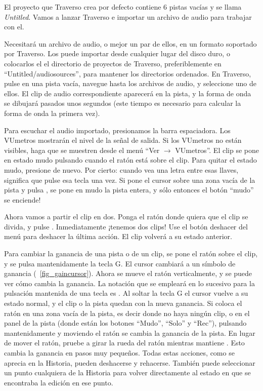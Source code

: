 ﻿El proyecto que Traverso crea por defecto contiene 6 pistas vacías y se llama \emph{Untitled}. Vamos a lanzar Traverso e importar un archivo de audio para trabajar con el.

Necesitará un archivo de audio, o mejor un par de ellos, en un formato soportado por Traverso. Los puede importar desde cualquier lugar del disco duro, o colocarlos el el directorio de proyectos de Traverso, preferiblemente en ``Untitled/audiosources'', para mantener los directorios ordenados. En Traverso, pulse  en una pista vacía, navegue hasta los archivos de audio, y seleccione uno de ellos. El clip de audio correspondiente aparecerá en la pista, y la forma de onda se dibujará pasados unos segundos (este tiempo es necesario para calcular la forma de onda la primera vez).

Para escuchar el audio importado, presionamos la barra espaciadora. Los VUmetros mostrarán el nivel de la señal de salida. Si los VUmetros no están visibles, haga que se muestren desde el menú ``Ver $\rightarrow$ VUmetros''. El clip se pone en estado mudo pulsando  cuando el ratón está sobre el clip. Para quitar el estado mudo, presione  de nuevo. Por cierto: cuando vea una letra entre esas llaves, significa que pulse esa tecla una vez. Si pone el cursor sobre una zona vacía de la pista y pulsa , se pone en mudo la pista entera, y sólo entonces el botón ``mudo'' se enciende!

Ahora vamos a partir el clip en dos. Ponga el ratón donde quiera que el clip se divida, y pulse . Inmediatamente ¡tenemos dos clips! Use el botón deshacer del menú para deshacer la última acción. El clip volverá a su estado anterior.

Para cambiar la ganancia de una pista o de un clip, se pone el ratón sobre el clip, y se pulsa mantenidamente la tecla G. El cursor cambiará a un símbolo de ganancia (\FigB\ \ref{fig_gaincursor}). Ahora se mueve el ratón verticalmente, y se puede ver cómo cambia la ganancia. La notación que se empleará en lo sucesivo para la pulsación mantenida de una tecla es . Al soltar la tecla G el cursor vuelve a su estado normal, y el clip o la pista quedan con la nueva ganancia. Si coloca el ratón en una zona vacía de la pista, es decir donde no haya ningún clip, o en el panel de la pista (donde están los botones ``Mudo'', ``Solo'' y ``Rec''), pulsando mantenidamente  y moviendo el ratón se cambia la ganancia de la pista. En lugar de mover el ratón, pruebe a girar la rueda del ratón mientras mantiene . Esto cambia la ganancia en pasos muy pequeños. Todas estas acciones, como se aprecia en la Historia, pueden deshacerse y rehacerse. También puede seleccionar un punto cualquiera de la Historia para volver directamente al estado en que se encontraba la edición en ese punto.

